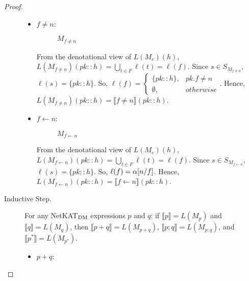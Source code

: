 \documentclass{article}
\newcommand\den[1]{\llbracket #1\rrbracket}
\renewcommand\star{^{\textstyle *}}
\begin{document}
\begin{proof}
\begin{description}
\begin{itemize}
  \item $f \neq n$:
  \begin{figure}[H]
    \centering
    \caption{$M_{f \neq n}$}
  \end{figure}
  
  From the denotational view of $L(M_e)(h)$,
  $L(M_{f \neq n})(pk::h) = \bigcup_{t\in F}\ell(t) = \ell(f)$. Since 
  $s \in S_{M_{f \neq n}}$, $\ell(s) = \{pk::h\}$. So, 
  $\ell(f) = \begin{cases} \{pk::h\}, & pk.f \neq n \\ \emptyset, 
  & otherwise \end{cases}$. Hence, 
  $L(M_{f \neq n})(pk::h) = \den{f \neq n}(pk::h)$.
  
  \item $f \gets n$:
  \begin{figure}[H]
    \centering
    \caption{$M_{f \gets n}$}
  \end{figure}
  
  From the denotational view of $L(M_e)(h)$,
  $L(M_{f \gets n})(pk::h) = \bigcup_{t\in F}\ell(t) = \ell(f)$. Since 
  $s \in S_{M_{f \gets n}}$, $\ell(s) = \{pk::h\}$. So, 
  $\ell(f) = \alpha[n/f]$. Hence, 
  $L(M_{f \gets n})(pk::h) = \den{f \gets n}(pk::h)$.
\end{itemize}
  
\item[Inductive Step.] For any NetKAT$_{\textnormal{DM}}$ expressions $p$ and 
$q$: if $\den{p} = L(M_{p})$ and $\den{q} = L(M_{q})$, then 
$\den{p+q} = L(M_{p+q})$, $\den{p;q} = L(M_{p;q})$, and
$\den{p\star} = L(M_{p\star})$.

\begin{itemize}
  \item $p+q$:
  \begin{figure}[H]
    \centering
\end{figure}
\end{itemize}
\end{description}
\end{proof}
\end{document}
